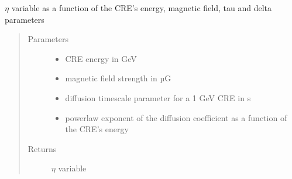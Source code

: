 \documentclass[letterpaper,10pt,english]{sphinxmanual}
\begin{document}

\begin{fulllineitems}
\label{\detokenize{diffsph.spectra:diffsph.spectra.synchrotron.eta}}
\sphinxAtStartPar
\(\eta\) variable as a function of the CRE’s energy, magnetic field, tau and delta parameters
\begin{quote}\begin{description}
\item[{Parameters}] \leavevmode\begin{itemize}
\item {} 
\sphinxAtStartPar
{} \textendash{} CRE energy in GeV

\item {} 
\sphinxAtStartPar
{} \textendash{} magnetic field strength in µG

\item {} 
\sphinxAtStartPar
{} \textendash{} diffusion time\sphinxhyphen{}scale parameter for a 1 GeV CRE in s

\item {} 
\sphinxAtStartPar
{} \textendash{} power\sphinxhyphen{}law exponent of the diffusion coefficient as a function of the CRE’s energy

\end{itemize}

\item[{Returns}] \leavevmode
\sphinxAtStartPar
\(\eta\) variable

\end{description}\end{quote}

\end{fulllineitems}

\end{document}
